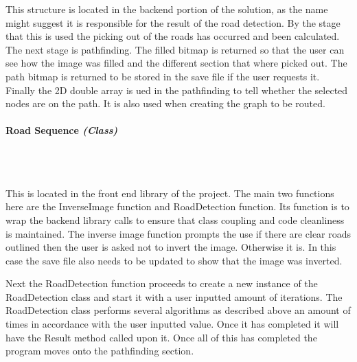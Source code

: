 \begin{FlushLeft}
    This structure is located in the backend portion of the solution, as the name might suggest it is responsible for the result of the road detection. By the stage that this is used the picking out of the roads has occurred and been calculated. The next stage is pathfinding. The filled bitmap is returned so that the user can see how the image was filled and the different section that where picked out. The path bitmap is returned to be stored in the save file if the user requests it. Finally the 2D double array is ued in the pathfinding to tell whether the selected nodes are on the path. It is also used when creating the graph to be routed.\\

    \bk

    \pagebreak
\paragraph{Road Sequence \textit{(Class)}} \mbox{} \\

    \begin{figure}[H]
        \centering
    \end{figure}\\

    This is located in the front end library of the project. The main two functions here are the InverseImage function and RoadDetection function. Its function is to wrap the backend library calls to ensure that class coupling and code cleanliness is maintained. The inverse image function prompts the use if there are clear roads outlined then the user is asked not to invert the image. Otherwise it is. In this case the save file also needs to be updated to show that the image was inverted. \\ \bk

    Next the RoadDetection function proceeds to create a new instance of the RoadDetection class and start it with a user inputted amount of iterations. The RoadDetection class performs several algorithms as described above an amount of times in accordance with the user inputted value. Once it has completed it will have the Result method called upon it. Once all of this has completed the program moves onto the pathfinding section.\\
    \bk


\end{FlushLeft}
